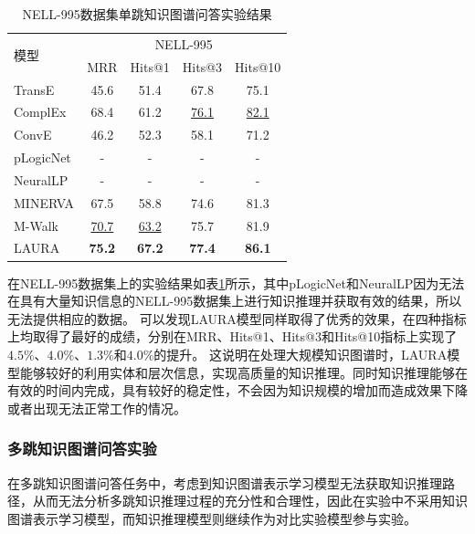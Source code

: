 \documentclass[algorithmlist, AutoFakeBold, AutoFakeSlant, figurelist, tablelist, nomlist, engineering, openany]{seuthesix} %
\begin{document}
\begin{table}[t]
  \centering
  \caption{NELL-995数据集单跳知识图谱问答实验结果}
  \begin{tabular*}{0.95\textwidth}{@{\extracolsep{\fill}}lcccc}
    \toprule[1pt]
    \multirow{2}{*}{模型} & \multicolumn{4}{c}{NELL-995} \\
      & MRR & Hits@1 & Hits@3 & Hits@10 \\ \hline
    TransE & 45.6 & 51.4 & 67.8 & 75.1 \\
    ComplEx & 68.4 & 61.2 & \underline{76.1} & \underline{82.1} \\
    ConvE & 46.2 & 52.3 & 58.1 & 71.2 \\
    pLogicNet & - & - & - & - \\
    NeuralLP & - & - & - & - \\
    MINERVA & 67.5 & 58.8 & 74.6 & 81.3 \\
    M-Walk & \underline{70.7} & \underline{63.2} & 75.7 & 81.9 \\
    LAURA & \textbf{75.2} & \textbf{67.2} & \textbf{77.4} & \textbf{86.1} \\
    \bottomrule[1pt]
  \end{tabular*}
  \label{Experiment2_NELL-995}
\end{table}

在NELL-995数据集上的实验结果如表\ref{Experiment2_NELL-995}所示，其中pLogicNet和NeuralLP因为无法在具有大量知识信息的NELL-995数据集上进行知识推理并获取有效的结果，所以无法提供相应的数据。
可以发现LAURA模型同样取得了优秀的效果，在四种指标上均取得了最好的成绩，分别在MRR、Hits@1、Hits@3和Hits@10指标上实现了$4.5\%$、$4.0\%$、$1.3\%$和$4.0\%$的提升。
这说明在处理大规模知识图谱时，LAURA模型能够较好的利用实体和层次信息，实现高质量的知识推理。同时知识推理能够在有效的时间内完成，具有较好的稳定性，不会因为知识规模的增加而造成效果下降或者出现无法正常工作的情况。

\subsubsection{多跳知识图谱问答实验}
在多跳知识图谱问答任务中，考虑到知识图谱表示学习模型无法获取知识推理路径，从而无法分析多跳知识推理过程的充分性和合理性，因此在实验中不采用知识图谱表示学习模型，而知识推理模型则继续作为对比实验模型参与实验。
\end{document}
